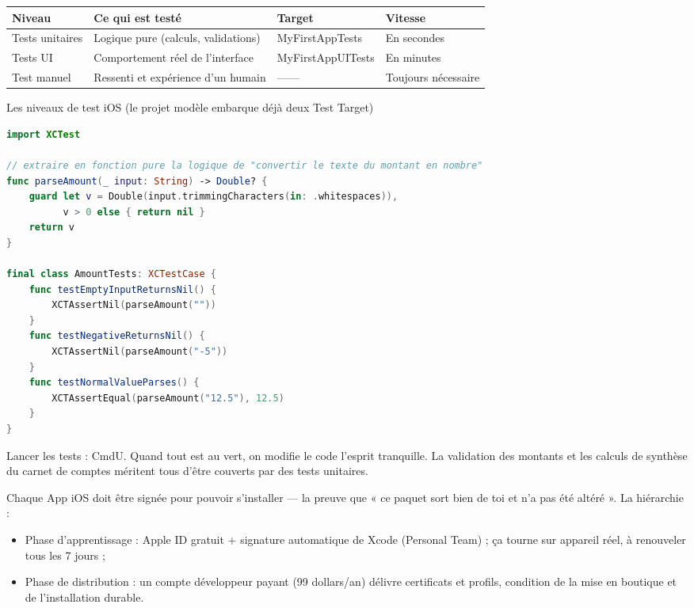 \begin{center}
\begin{tabularx}{\linewidth}{|X|X|X|X|}
\hline
\textbf{Niveau} & \textbf{Ce qui est testé} & \textbf{Target} & \textbf{Vitesse} \tabularnewline
\hline
Tests unitaires & Logique pure (calculs, validations) & MyFirstAppTests & En secondes \tabularnewline
Tests UI & Comportement réel de l'interface & MyFirstAppUITests & En minutes \tabularnewline
Test manuel & Ressenti et expérience d'un humain & —— & Toujours nécessaire \tabularnewline
\hline
\end{tabularx}
\end{center}

\begin{center}\small\color{gray}Les niveaux de test iOS (le projet modèle embarque déjà deux Test Target)\end{center}

\begin{lstlisting}[language=Swift]
import XCTest

// extraire en fonction pure la logique de "convertir le texte du montant en nombre"
func parseAmount(_ input: String) -> Double? {
    guard let v = Double(input.trimmingCharacters(in: .whitespaces)),
          v > 0 else { return nil }
    return v
}

final class AmountTests: XCTestCase {
    func testEmptyInputReturnsNil() {
        XCTAssertNil(parseAmount(""))
    }
    func testNegativeReturnsNil() {
        XCTAssertNil(parseAmount("-5"))
    }
    func testNormalValueParses() {
        XCTAssertEqual(parseAmount("12.5"), 12.5)
    }
}
\end{lstlisting}

Lancer les tests : CmdU. Quand tout est au vert, on modifie le code l'esprit tranquille. La validation des montants et les calculs de synthèse du carnet de comptes méritent tous d'être couverts par des tests unitaires.


Chaque App iOS doit être signée pour pouvoir s'installer — la preuve que « ce paquet sort bien de toi et n'a pas été altéré ». La hiérarchie :

\begin{itemize}
  \item Phase d'apprentissage : Apple ID gratuit + signature automatique de Xcode (Personal Team) ; ça tourne sur appareil réel, à renouveler tous les 7 jours ;
  \item Phase de distribution : un compte développeur payant (99 dollars/an) délivre certificats et profils, condition de la mise en boutique et de l'installation durable.
\end{itemize}

